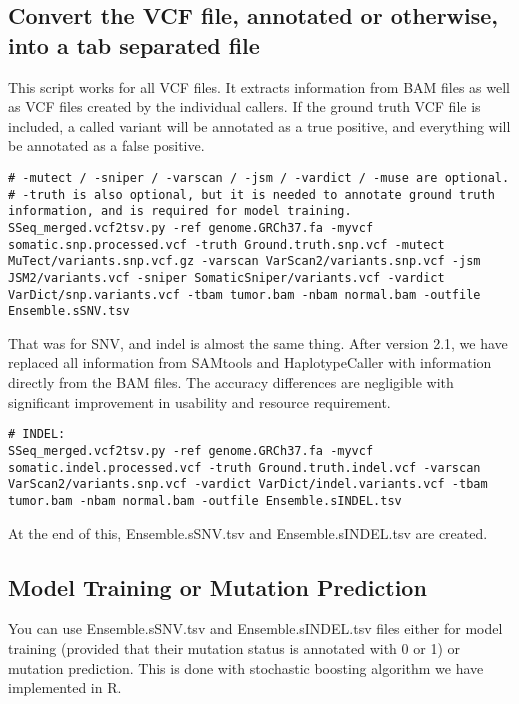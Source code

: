 \documentclass[10pt,letterpaper]{article}
\begin{document}
\begin{sloppypar}
\begin{lstlisting}
\end{lstlisting}



\subsection{Convert the VCF file, annotated or otherwise, into a tab separated file}
This script works for all VCF files. It extracts information from BAM files as well as VCF files created by the individual callers. If the ground truth VCF file is included, a called variant will be annotated as a true positive, and everything will be annotated as a false positive. 
	
	
\begin{lstlisting}
# -mutect / -sniper / -varscan / -jsm / -vardict / -muse are optional. 
# -truth is also optional, but it is needed to annotate ground truth information, and is required for model training.
SSeq_merged.vcf2tsv.py -ref genome.GRCh37.fa -myvcf somatic.snp.processed.vcf -truth Ground.truth.snp.vcf -mutect MuTect/variants.snp.vcf.gz -varscan VarScan2/variants.snp.vcf -jsm JSM2/variants.vcf -sniper SomaticSniper/variants.vcf -vardict VarDict/snp.variants.vcf -tbam tumor.bam -nbam normal.bam -outfile Ensemble.sSNV.tsv
\end{lstlisting}


That was for SNV, and indel is almost the same thing. After version 2.1, we have replaced all information from SAMtools and HaplotypeCaller with information directly from the BAM files. The accuracy differences are negligible with significant improvement in usability and resource requirement.

\begin{lstlisting}
# INDEL:
SSeq_merged.vcf2tsv.py -ref genome.GRCh37.fa -myvcf somatic.indel.processed.vcf -truth Ground.truth.indel.vcf -varscan VarScan2/variants.snp.vcf -vardict VarDict/indel.variants.vcf -tbam tumor.bam -nbam normal.bam -outfile Ensemble.sINDEL.tsv
\end{lstlisting}


At the end of this, Ensemble.sSNV.tsv and Ensemble.sINDEL.tsv are created. 



\subsection{Model Training or Mutation Prediction}

You can use Ensemble.sSNV.tsv and Ensemble.sINDEL.tsv files either for model training (provided that their mutation status is annotated with 0 or 1) or mutation prediction. This is done with stochastic boosting algorithm we have implemented in R. 
	

\end{sloppypar}
\end{document}
